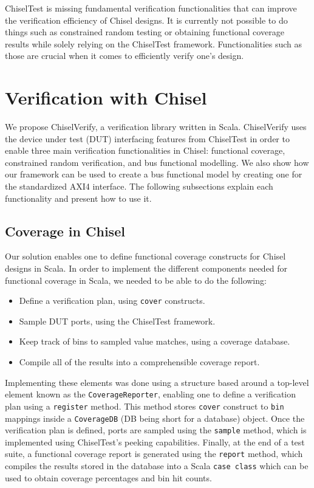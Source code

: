 \documentclass[conference]{IEEEtran}
\begin{document}
ChiselTest is missing fundamental verification functionalities that can improve the verification efficiency of Chisel designs. 
It is currently not possible to do things such as constrained random testing or obtaining functional coverage results while solely relying on the ChiselTest framework. 
Functionalities such as those are crucial when it comes to efficiently verify one's design.

\section{Verification with Chisel}

We propose ChiselVerify, a verification library written in Scala. 
ChiselVerify uses the device under test (DUT) interfacing features from ChiselTest in order to enable three main verification functionalities in Chisel: functional coverage, constrained random verification, and bus functional modelling. 
We also show how our framework can be used to create a bus functional model by creating one for the standardized AXI4 interface. 
The following subsections explain each functionality and present how to use it.

\subsection{Coverage in Chisel}
Our solution enables one to define functional coverage constructs for Chisel designs in Scala.
In order to implement the different components needed for functional coverage in Scala, we needed to be able to do the following:

\begin{itemize}
  \item Define a verification plan, using \texttt{cover} constructs.
  \item Sample DUT ports, using the ChiselTest framework.
  \item Keep track of bins to sampled value matches, using a coverage database.
  \item Compile all of the results into a comprehensible coverage report.
\end{itemize}

Implementing these elements was done using a structure based around a top-level element known as the \texttt{CoverageReporter}, enabling one to define a verification plan using a \texttt{register} method. 
This method stores \texttt{cover} construct to \texttt{bin} mappings inside a \texttt{CoverageDB} (DB being short for a database) object. 
Once the verification plan is defined, ports are sampled using the \texttt{sample} method, which is implemented using ChiselTest's peeking capabilities. 
Finally, at the end of a test suite, a functional coverage report is generated using the \texttt{report} method, which compiles the results stored in the database into a Scala \texttt{case class} which can be used to obtain coverage percentages and bin hit counts.
\end{document}
